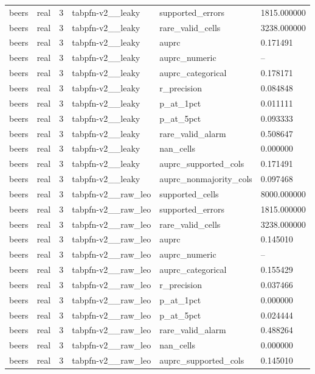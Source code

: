 \begin{tabular}{llllll}
beers & real & 3 & tabpfn-v2\_\_leaky & supported\_errors & 1815.000000 \\
beers & real & 3 & tabpfn-v2\_\_leaky & rare\_valid\_cells & 3238.000000 \\
beers & real & 3 & tabpfn-v2\_\_leaky & auprc & 0.171491 \\
beers & real & 3 & tabpfn-v2\_\_leaky & auprc\_numeric & -- \\
beers & real & 3 & tabpfn-v2\_\_leaky & auprc\_categorical & 0.178171 \\
beers & real & 3 & tabpfn-v2\_\_leaky & r\_precision & 0.084848 \\
beers & real & 3 & tabpfn-v2\_\_leaky & p\_at\_1pct & 0.011111 \\
beers & real & 3 & tabpfn-v2\_\_leaky & p\_at\_5pct & 0.093333 \\
beers & real & 3 & tabpfn-v2\_\_leaky & rare\_valid\_alarm & 0.508647 \\
beers & real & 3 & tabpfn-v2\_\_leaky & nan\_cells & 0.000000 \\
beers & real & 3 & tabpfn-v2\_\_leaky & auprc\_supported\_cols & 0.171491 \\
beers & real & 3 & tabpfn-v2\_\_leaky & auprc\_nonmajority\_cols & 0.097468 \\
beers & real & 3 & tabpfn-v2\_\_raw\_leo & supported\_cells & 8000.000000 \\
beers & real & 3 & tabpfn-v2\_\_raw\_leo & supported\_errors & 1815.000000 \\
beers & real & 3 & tabpfn-v2\_\_raw\_leo & rare\_valid\_cells & 3238.000000 \\
beers & real & 3 & tabpfn-v2\_\_raw\_leo & auprc & 0.145010 \\
beers & real & 3 & tabpfn-v2\_\_raw\_leo & auprc\_numeric & -- \\
beers & real & 3 & tabpfn-v2\_\_raw\_leo & auprc\_categorical & 0.155429 \\
beers & real & 3 & tabpfn-v2\_\_raw\_leo & r\_precision & 0.037466 \\
beers & real & 3 & tabpfn-v2\_\_raw\_leo & p\_at\_1pct & 0.000000 \\
beers & real & 3 & tabpfn-v2\_\_raw\_leo & p\_at\_5pct & 0.024444 \\
beers & real & 3 & tabpfn-v2\_\_raw\_leo & rare\_valid\_alarm & 0.488264 \\
beers & real & 3 & tabpfn-v2\_\_raw\_leo & nan\_cells & 0.000000 \\
beers & real & 3 & tabpfn-v2\_\_raw\_leo & auprc\_supported\_cols & 0.145010 \\

\end{tabular}
